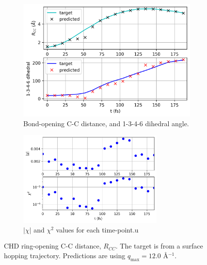 \documentclass[]{article}
\begin{document}
	
	\begin{figure}[H]
		\centering
		\begin{subfigure}{0.8\textwidth}
		\includegraphics[width=\textwidth]{rcc_plots.png}
		\caption{Bond-opening C-C distance, and 1-3-4-6 dihedral angle.}
		\end{subfigure}
	\hfill
		\begin{subfigure}{\textwidth}
			\includegraphics[width=0.8\textwidth]{chi2_t.png}
			\caption{$|\chi|$ and $\chi^2$ values for each time-point.u}
		\end{subfigure}
		\caption{CHD ring-opening C-C distance, $R_{CC}$. The target is from a surface hopping trajectory. Predictions are using $q_\textrm{max} = 12.0$ \AA$^{-1}$.}
		\label{fig:rcc_q25}
	\end{figure}
\end{document}
